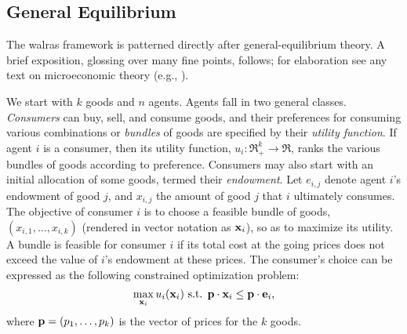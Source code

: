 \subsection{General Equilibrium}

The {\sc walras} framework is patterned directly after 
general-equilibrium theory.  A brief exposition, glossing over many fine 
points, follows; for elaboration 
see any text on microeconomic theory (e.g., \cite{Varian84}).

We start with $k$ goods and $n$ agents.
Agents fall in two general classes. {\em Consumers\/} can buy, sell, and consume
goods, and their preferences for consuming various combinations or {\em 
bundles\/} of goods
are specified by their {\em utility function}.  If agent $i$ is a 
consumer, then its utility function, $u_i:\Re_{+}^{k}\rightarrow\Re$, ranks the 
various bundles of goods according to preference.
Consumers may also start with an initial allocation of some goods, termed their
{\em endowment}.  Let $e_{i,j}$ denote agent $i$'s endowment of good $j$, 
and $x_{i,j}$ the amount of good $j$ that $i$ ultimately consumes.
The objective of consumer $i$ is to choose a feasible bundle of goods, 
$(x_{i,1},\ldots,x_{i,k})$ (rendered in vector notation as ${\bf x}_i$),
so as to maximize its utility.
A bundle is feasible for consumer $i$ if its total cost at the going prices
does not exceed the value of $i$'s endowment at these prices.
The consumer's choice can be expressed as the following constrained 
optimization problem:
\begin{equation}\label{e-consumer}
\max_{{\bf x}_i} u_i({\bf x}_i)\mbox{ s.t. }
{\bf p}\cdot{\bf x}_i \leq {\bf p}\cdot{\bf e}_i,
\end{equation}
where ${\bf p}=(p_1,\ldots,p_k)$ is the vector of prices for the $k$ goods.

